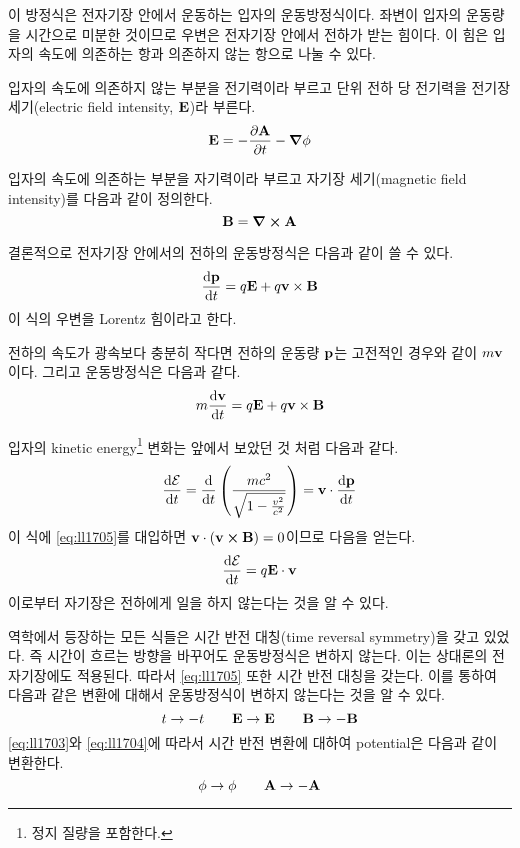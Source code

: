 이 방정식은 전자기장 안에서 운동하는 입자의 운동방정식이다. 좌변이 입자의 운동량을 시간으로 미분한 것이므로 우변은 전자기장 안에서 전하가 받는 힘이다. 이 힘은 입자의 속도에 의존하는 항과 의존하지 않는 항으로 나눌 수 있다.

입자의 속도에 의존하지 않는 부분을 전기력이라 부르고 단위 전하 당 전기력을 전기장 세기(electric field intensity, $\vb{E}$)라 부른다.
\begin{equation}\label{eq:ll1703}
    \vb{E} = - \pdv{\vb{A}}{t} - \grad \phi
\end{equation}

입자의 속도에 의존하는 부분을 자기력이라 부르고 자기장 세기(magnetic field intensity)를 다음과 같이 정의한다.
\begin{equation}\label{eq:ll1704}
    \vb{B} = \curl \vb{A}
\end{equation}

결론적으로 전자기장 안에서의 전하의 운동방정식은 다음과 같이 쓸 수 있다.
\begin{equation}\label{eq:ll1705}
    \dv{\vb{p}}{t} = q \vb{E} + q \vb{v} \times \vb{B}
\end{equation}
이 식의 우변을 Lorentz 힘이라고 한다.

전하의 속도가 광속보다 충분히 작다면 전하의 운동량 $\vb{p}$는 고전적인 경우와 같이 $m \vb{v}$이다. 그리고 운동방정식은 다음과 같다.
\begin{equation}
    m \dv{\vb{v}}{t} = q \vb{E} + q \vb{v} \times \vb{B}
\end{equation}

입자의 kinetic energy\footnote{정지 질량을 포함한다.} 변화는 앞에서 보았던 것 처럼 다음과 같다.
\begin{equation*}
    \dv{\mathcal{E}}{t}
    = \dv{t} \left( \frac{m c^2}{\sqrt{1 - \frac{v^2}{c^2}}} \right)
    = \vb{v} \cdot \dv{\vb{p}}{t}
\end{equation*}
이 식에 \eqref{eq:ll1705}를 대입하면 $\vb{v} \cdot ( \vb{v} \cross \vb{B} ) = 0$이므로 다음을 얻는다.
\begin{equation}
    \dv{\mathcal{E}}{t} = q \vb{E} \cdot \vb{v}
\end{equation}
이로부터 자기장은 전하에게 일을 하지 않는다는 것을 알 수 있다.

역학에서 등장하는 모든 식들은 시간 반전 대칭(time reversal symmetry)을 갖고 있었다. 즉 시간이 흐르는 방향을 바꾸어도 운동방정식은 변하지 않는다. 이는 상대론의 전자기장에도 적용된다. 따라서 \eqref{eq:ll1705} 또한 시간 반전 대칭을 갖는다. 이를 통하여 다음과 같은 변환에 대해서 운동방정식이 변하지 않는다는 것을 알 수 있다.
\begin{equation}
    t \to -t \qquad \vb{E} \to \vb{E} \qquad \vb{B} \to - \vb{B}
\end{equation}
\eqref{eq:ll1703}와 \eqref{eq:ll1704}에 따라서 시간 반전 변환에 대하여 potential은 다음과 같이 변환한다.
\begin{equation}
    \phi \to \phi \qquad \vb{A} \to - \vb{A}
\end{equation}
